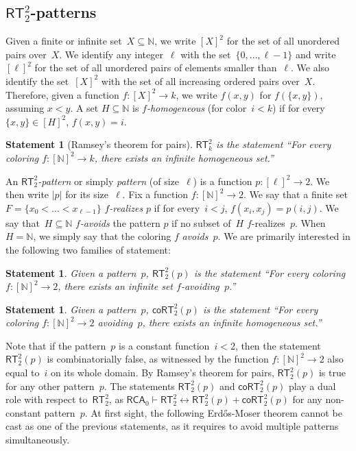 \documentclass{article}
\numberwithin{theorem}{section}
\newtheorem{statement}[theorem]{Statement}
\newcommand{\RCA}[0]{\mathsf{RCA}}
\newcommand{\RT}[0]{\mathsf{RT}}
\newcommand{\coRT}[0]{\mathsf{coRT}}
\newcommand{\NN}[0]{\mathbb{N}}
\def\qt#1{``#1''}%
\def\qt#1{``#1''}%
\begin{document}
\subsection{$\RT^2_2$-patterns}

Given a finite or infinite set~$X \subseteq \NN$, we write $[X]^2$ for the set of all unordered pairs over~$X$. We identify any integer~$\ell$ with the set~$\{0, \dots, \ell-1\}$ and write $[\ell]^2$ for the set of all unordered pairs of elements smaller than~$\ell$. We also identify the set~$[X]^2$ with the set of all increasing ordered pairs over~$X$. Therefore, given a function $f : [X]^2 \to k$, we write $f(x, y)$ for $f(\{x, y\})$, assuming $x < y$. A set $H \subseteq \NN$ is \emph{$f$-homogeneous} (for color~$i < k$) if for every~$\{x,y\} \in [H]^2$, $f(x, y) = i$.

\begin{statement}[Ramsey's theorem for pairs]
$\RT^2_k$ is the statement \qt{For every coloring $f : [\NN]^2 \to k$, there exists an infinite homogeneous set.}
\end{statement}

An \emph{$\RT^2_2$-pattern} or simply \emph{pattern} (of size~$\ell$) is a function $p : [\ell]^2 \to 2$. We then write $|p|$ for its size~$\ell$.
Fix a function $f : [\NN]^2 \to 2$. We say that a finite set $F = \{ x_0 < \dots < x_{\ell-1} \}$ \emph{$f$-realizes} $p$ if for every~$i < j$, $f(x_i, x_j) = p(i,j)$. We say that~$H \subseteq \NN$ \emph{$f$-avoids} the pattern $p$ if no subset of~$H$ $f$-realizes~$p$. When~$H = \NN$, we simply say that the coloring $f$ \emph{avoids~$p$}. We are primarily interested in the following two families of statement:

\begin{statement}
Given a pattern~$p$, $\RT^2_2(p)$ is the statement \qt{For every coloring $f : [\NN]^2 \to 2$, there exists an infinite set $f$-avoiding~$p$.}
\end{statement}

\begin{statement}
Given a pattern~$p$, $\coRT^2_2(p)$ is the statement \qt{For every coloring $f : [\NN]^2 \to 2$ avoiding~$p$, there exists an infinite homogeneous set.}
\end{statement}

Note that if the pattern~$p$ is a constant function~$i < 2$, then the statement $\RT^2_2(p)$ is combinatorially false, as witnessed by the function $f : [\NN]^2 \to 2$ also equal to~$i$ on its whole domain.
By Ramsey's theorem for pairs, $\RT^2_2(p)$ is true for any other pattern~$p$.
The statements $\RT^2_2(p)$ and $\coRT^2_2(p)$ play a dual role with respect to~$\RT^2_2$, as $\RCA_0 \vdash \RT^2_2 \leftrightarrow \RT^2_2(p) + \coRT^2_2(p)$ for any non-constant pattern~$p$. At first sight, the following Erd\H{o}s-Moser theorem cannot be cast as one of the previous statements, as it requires to avoid multiple patterns simultaneously.
\end{document}
